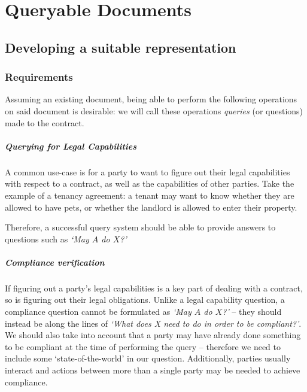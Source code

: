 \chapter{Queryable Documents}\label{ch:queries}


\section{Developing a suitable representation}\label{sec:queries-representation}

\subsection{Requirements}\label{subsec:queries-requirements}

Assuming an existing document, being able to perform the following operations on said document is desirable: we will call these operations \emph{queries} (or questions) made to the contract.

\paragraph{Querying for Legal Capabilities} A common use-case is for a party to want to figure out their legal capabilities with respect to a contract, as well as the capabilities of other parties.
Take the example of a tenancy agreement: a tenant may want to know whether they are allowed to have pets, or whether the landlord is allowed to enter their property.

Therefore, a successful query system should be able to provide answers to questions such as \textit{`May $A$ do $X$?'}

\paragraph{Compliance verification} If figuring out a party's legal capabilities is a key part of dealing with a contract, so is figuring out their legal obligations.
Unlike a legal capability question, a compliance question cannot be formulated as \textit{`May $A$ do $X$?'} -- they should instead be along the lines of \textit{`What does X need to do in order to be compliant?'}.
We should also take into account that a party may have already done something to be compliant at the time of performing the query -- therefore we need to include some `state-of-the-world' in our question.
Additionally, parties usually interact and actions between more than a single party may be needed to achieve compliance.

